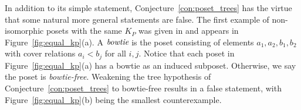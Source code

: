 \begin{remark}
In addition to its simple statement, Conjecture~\ref{con:poset_trees} has the virtue that some natural more general statements are false.  The first example of non-isomorphic posets with the same $K_P$ was given in \cite{McWa14} and appears in Figure~\ref{fig:equal_kp}(a).  A $\emph{bowtie}$ is the poset consisting of elements $a_1,a_2,b_1,b_2$ with cover relations $a_i < b_j$ for all $i,j$.  Notice that each poset in Figure~\ref{fig:equal_kp}(a) has a bowtie as an induced subposet.  Otherwise, we say the poset is \emph{bowtie-free}.  Weakening the tree hypothesis of Conjecture~\ref{con:poset_trees} to bowtie-free results in a false statement, with Figure~\ref{fig:equal_kp}(b) being the smallest counterexample.
\begin{figure}
\begin{center}
\end{center}
\end{figure}
\end{remark}
